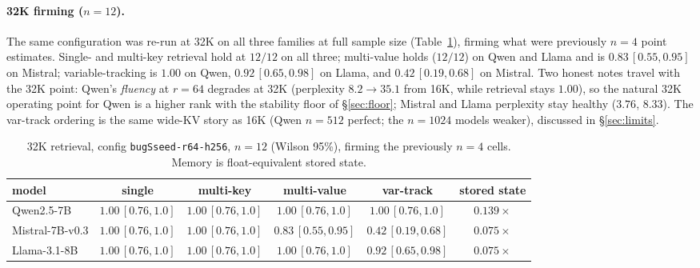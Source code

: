\documentclass[11pt]{article}
\begin{document}
\paragraph{32K firming ($n{=}12$).} The same configuration was re-run at 32K on
all three families at full sample size (Table~\ref{tab:xmodel32}), firming what
were previously $n{=}4$ point estimates. Single- and multi-key retrieval hold at
$12/12$ on all three; multi-value holds ($12/12$) on Qwen and Llama and is
$0.83\,[0.55,0.95]$ on Mistral; variable-tracking is $1.00$ on Qwen,
$0.92\,[0.65,0.98]$ on Llama, and $0.42\,[0.19,0.68]$ on Mistral. Two honest
notes travel with the 32K point: Qwen's \emph{fluency} at $r{=}64$ degrades at
32K (perplexity $8.2\to35.1$ from 16K, while retrieval stays $1.00$), so the
natural 32K operating point for Qwen is a higher rank with the stability floor of
\S\ref{sec:floor}; Mistral and Llama perplexity stay healthy ($3.76$, $8.33$).
The var-track ordering is the same wide-KV story as 16K (Qwen $n{=}512$ perfect;
the $n{=}1024$ models weaker), discussed in \S\ref{sec:limits}.

\begin{table}[t]
\centering
\caption{32K retrieval, config \texttt{bugSseed-r64-h256}, $n{=}12$ (Wilson 95\%),
firming the previously $n{=}4$ cells. Memory is float-equivalent stored state.}
\label{tab:xmodel32}
\small
\begin{tabular}{lccccc}
\toprule
model & single & multi-key & multi-value & var-track & stored state \\
\midrule
Qwen2.5-7B      & $1.00\,[0.76,1.0]$ & $1.00\,[0.76,1.0]$ & $1.00\,[0.76,1.0]$ & $\mathbf{1.00}\,[0.76,1.0]$ & $0.139\times$ \\
Mistral-7B-v0.3 & $1.00\,[0.76,1.0]$ & $1.00\,[0.76,1.0]$ & $0.83\,[0.55,0.95]$ & $0.42\,[0.19,0.68]$          & $0.075\times$ \\
Llama-3.1-8B    & $1.00\,[0.76,1.0]$ & $1.00\,[0.76,1.0]$ & $1.00\,[0.76,1.0]$ & $0.92\,[0.65,0.98]$          & $0.075\times$ \\
\bottomrule
\end{tabular}
\end{table}
\end{document}
